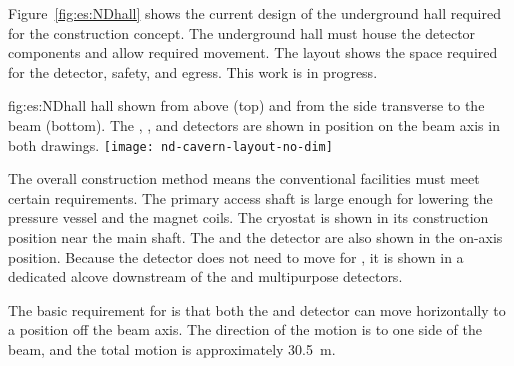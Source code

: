 Figure~\ref{fig:es:NDhall} shows the current design of the underground hall required for the   construction concept. The underground hall must house the detector components and allow required movement. The layout shows the space required for the detector, safety, and egress.  This  work is in progress. 


\begin{dunefigure}{fig:es:NDhall}
{   hall shown from above (top) and from the side transverse to the beam (bottom). The , , and  detectors are shown in position on the beam axis in both drawings. }
\texttt{[image: nd-cavern-layout-no-dim]}
\end{dunefigure}

The overall construction method means the conventional facilities must meet certain requirements. 
The primary access shaft is large enough for lowering the pressure vessel and the magnet coils. The  cryostat is shown in its construction position near the main shaft. The  and the  detector are also shown in the on-axis position. Because the  detector does not need to move for , it is shown in a dedicated alcove downstream of the  and multipurpose detectors.


The basic requirement for  is that both the  and  detector can move horizontally to a position off the beam axis. The direction of the motion is to one side of the beam, and the total motion is approximately 30.5~m. 





